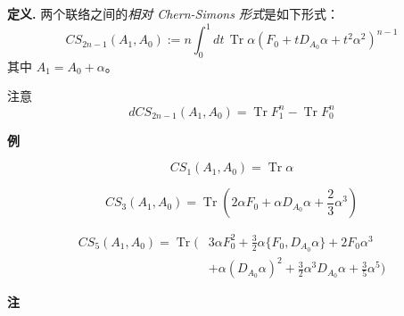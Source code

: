 \textbf{定义.} 两个联络之间的\emph{相对 Chern-Simons 形式}是如下形式：
\begin{equation}
  CS_{2n-1}(A_1,A_0) := n\int_0^1 dt\,\operatorname{Tr}\alpha
  \left(F_0+tD_{A_0}\alpha+t^2\alpha^2\right)^{n-1}
  \tag{I.29}
  \label{eq:I.29}
\end{equation}
其中 $A_1=A_0+\alpha$。

注意
\begin{equation}
  dCS_{2n-1}(A_1,A_0) = \operatorname{Tr}F_1^n-\operatorname{Tr}F_0^n
  \tag{I.30}
  \label{eq:I.30}
\end{equation}

\textbf{例}

\begin{equation}
  CS_1(A_1,A_0) = \operatorname{Tr}\alpha
  \tag{I.31}
  \label{eq:I.31}
\end{equation}

\begin{equation}
  CS_3(A_1,A_0) = \operatorname{Tr}\left(2\alpha F_0+\alpha D_{A_0}\alpha+\frac{2}{3}\alpha^3\right)
  \tag{I.32}
  \label{eq:I.32}
\end{equation}

\begin{equation}
\begin{aligned}
  CS_5(A_1,A_0) = \operatorname{Tr}\Big(&
    3\alpha F_0^2+\frac{3}{2}\alpha\{F_0,D_{A_0}\alpha\}+2F_0\alpha^3\\
  &+\alpha(D_{A_0}\alpha)^2+\frac{3}{2}\alpha^3D_{A_0}\alpha+\frac{3}{5}\alpha^5\Big)
\end{aligned}
  \tag{I.33}
  \label{eq:I.33}
\end{equation}


\textbf{注}

